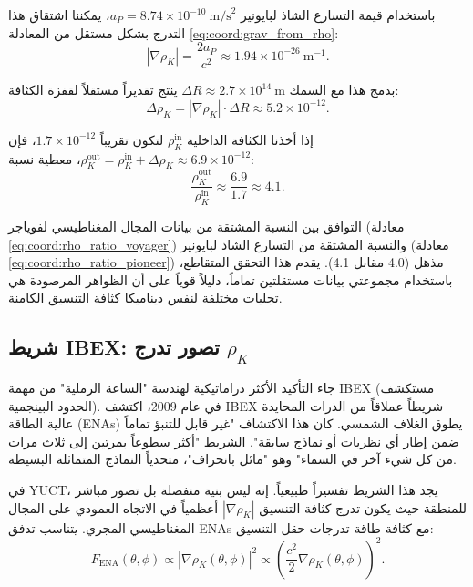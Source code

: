 \documentclass[11pt,a4paper]{article}
\theoremstyle{remark}
\begin{document}
	باستخدام قيمة التسارع الشاذ لبايونير \(a_P = 8.74 \times 10^{-10}\ \text{m/s}^2\)، يمكننا اشتقاق هذا التدرج بشكل مستقل من المعادلة \eqref{eq:coord:grav_from_rho}:
	\begin{equation}
		|\nabla \rho_K| = \frac{2a_P}{c^2} \approx 1.94 \times 10^{-26}\ \text{m}^{-1}.
		\label{eq:coord:gradient_pioneer}
	\end{equation}
	
	بدمج هذا مع السمك \(\Delta R \approx 2.7 \times 10^{14}\ \text{m}\) ينتج تقديراً مستقلاً لقفزة الكثافة:
	\begin{equation}
		\Delta \rho_K = |\nabla \rho_K| \cdot \Delta R \approx 5.2 \times 10^{-12}.
		\label{eq:coord:delta_rho_pioneer}
	\end{equation}
	
	إذا أخذنا الكثافة الداخلية \(\rho_K^{\text{in}}\) لتكون تقريباً \(1.7 \times 10^{-12}\)، فإن \(\rho_K^{\text{out}} = \rho_K^{\text{in}} + \Delta \rho_K \approx 6.9 \times 10^{-12}\)، معطية نسبة:
	\begin{equation}
		\frac{\rho_K^{\text{out}}}{\rho_K^{\text{in}}} \approx \frac{6.9}{1.7} \approx 4.1.
		\label{eq:coord:rho_ratio_pioneer}
	\end{equation}
	
	التوافق بين النسبة المشتقة من بيانات المجال المغناطيسي لفوياجر (معادلة \eqref{eq:coord:rho_ratio_voyager}) والنسبة المشتقة من التسارع الشاذ لبايونير (معادلة \eqref{eq:coord:rho_ratio_pioneer}) مذهل (4.0 مقابل 4.1). يقدم هذا التحقق المتقاطع، باستخدام مجموعتي بيانات مستقلتين تماماً، دليلاً قوياً على أن الظواهر المرصودة هي تجليات مختلفة لنفس ديناميكا كثافة التنسيق الكامنة.
	
	\subsection{شريط IBEX: تصور تدرج \(\rho_K\)}
	\label{subsec:coord:ibex}
	
	جاء التأكيد الأكثر دراماتيكية لهندسة "الساعة الرملية" من مهمة IBEX (مستكشف الحدود البينجمية). في عام 2009، اكتشف IBEX شريطاً عملاقاً من الذرات المحايدة عالية الطاقة (ENAs) يطوق الغلاف الشمسي. كان هذا الاكتشاف "غير قابل للتنبؤ تماماً ضمن إطار أي نظريات أو نماذج سابقة". الشريط "أكثر سطوعاً بمرتين إلى ثلاث مرات من كل شيء آخر في السماء" وهو "مائل بانحراف"، متحدياً النماذج المتماثلة البسيطة.
	
	في YUCT، يجد هذا الشريط تفسيراً طبيعياً. إنه ليس بنية منفصلة بل تصور مباشر للمنطقة حيث يكون تدرج كثافة التنسيق \(|\nabla \rho_K|\) أعظمياً في الاتجاه العمودي على المجال المغناطيسي المجري. يتناسب تدفق ENAs مع كثافة طاقة تدرجات حقل التنسيق:
	\begin{equation}
		F_{\text{ENA}}(\theta, \phi) \propto |\nabla \rho_K(\theta, \phi)|^2 \propto \left( \frac{c^2}{2} \nabla \rho_K(\theta, \phi) \right)^2.
		\label{eq:coord:ibex_flux}
	\end{equation}
	
\end{document}
